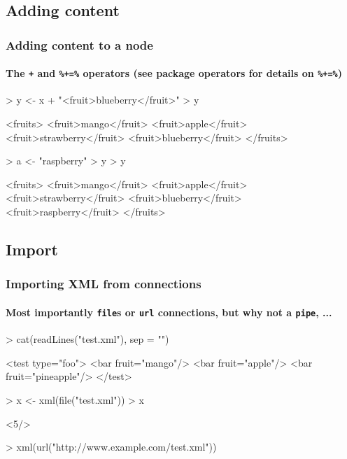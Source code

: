 \documentclass[smaller]{beamer}
\newcommand{\rfun}[1]{\texttt{#1}}
\begin{document}
\subsection{Adding content}
\begin{frame}[fragile]
\frametitle{Adding content to a node}
\framesubtitle{The \texttt{+} and \texttt{\%+=\%} operators (see package operators for details on \texttt{\%+=\%}) } 

\begin{Schunk}
\begin{Sinput}
> y <- x + "<fruit>blueberry</fruit>"
> y
\end{Sinput}
\begin{Soutput}
<fruits>
 <fruit>mango</fruit>
 <fruit>apple</fruit>
 <fruit>strawberry</fruit>
 <fruit>blueberry</fruit>
</fruits>
\end{Soutput}
\begin{Sinput}
> a <- "raspberry"
> y %
> y
\end{Sinput}
\begin{Soutput}
<fruits>
 <fruit>mango</fruit>
 <fruit>apple</fruit>
 <fruit>strawberry</fruit>
 <fruit>blueberry</fruit>
 <fruit>raspberry</fruit>
</fruits>
\end{Soutput}
\end{Schunk}
\end{frame}

\subsection{Import}
\begin{frame}[fragile]
\frametitle{Importing XML from connections}
\framesubtitle{Most importantly \rfun{file}s or \rfun{url} connections, but why not a \rfun{pipe}, ...} 

\begin{Schunk}
\begin{Sinput}
> cat(readLines("test.xml"), sep = "\n")
\end{Sinput}
\begin{Soutput}
<test type="foo">
 <bar fruit="mango"/>
 <bar fruit="apple"/>
 <bar fruit="pineapple"/>
</test>
\end{Soutput}
\begin{Sinput}
> x <- xml(file("test.xml"))
> x
\end{Sinput}
\begin{Soutput}
<5/>
\end{Soutput}
\end{Schunk}
\begin{Schunk}
\begin{Sinput}
> xml(url("http://www.example.com/test.xml"))
\end{Sinput}
\end{Schunk}
\end{frame}
\end{document}
